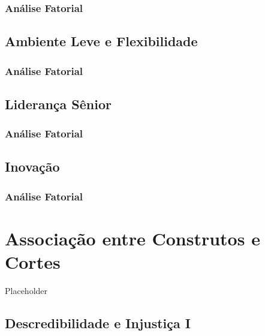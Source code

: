 \documentclass[]{book}
\begin{document}
\hypertarget{analise-fatorial-8}{%
\subsection{Análise Fatorial}\label{analise-fatorial-8}}

\hypertarget{ambiente-leve-e-flexibilidade}{%
\section{Ambiente Leve e Flexibilidade}\label{ambiente-leve-e-flexibilidade}}

\hypertarget{analise-fatorial-9}{%
\subsection{Análise Fatorial}\label{analise-fatorial-9}}

\hypertarget{lideranca-senior}{%
\section{Liderança Sênior}\label{lideranca-senior}}

\hypertarget{analise-fatorial-10}{%
\subsection{Análise Fatorial}\label{analise-fatorial-10}}

\hypertarget{inovacao}{%
\section{Inovação}\label{inovacao}}

\hypertarget{analise-fatorial-11}{%
\subsection{Análise Fatorial}\label{analise-fatorial-11}}

\hypertarget{associacao-entre-construtos-e-cortes}{%
\chapter{Associação entre Construtos e Cortes}\label{associacao-entre-construtos-e-cortes}}

Placeholder

\hypertarget{descredibilidade-e-injustica-i}{%
\section{Descredibilidade e Injustiça I}\label{descredibilidade-e-injustica-i}}
\end{document}
